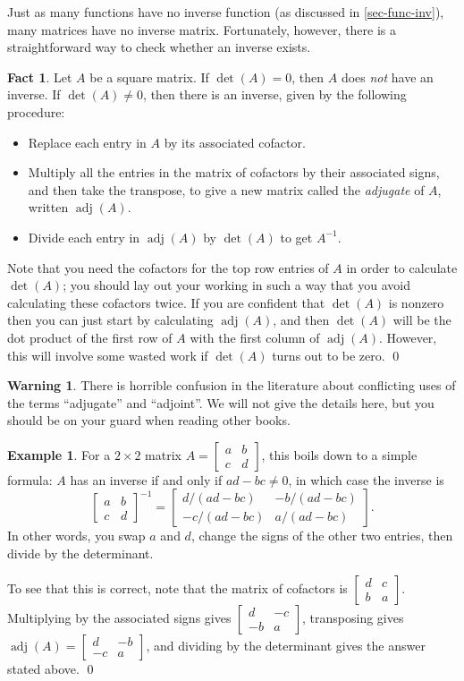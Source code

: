 \documentclass[a4paper]{book}
\newcommand{\RED}[1]{{\color{red}#1}}
\newcommand{\PURPLE}[1]{{\color{purple}#1}}
\newcommand{\bbm}       {\begin{bmatrix}}
\newcommand{\ebm}       {\end{bmatrix}}
\newcommand{\tm}        {\times}
\newcommand{\adj}       {\operatorname{adj}}
\renewcommand{\:}{\colon}
\newcommand{\EMPH}[1]{\RED{\emph{#1}}}
\newcommand{\DEFN}[1]{\PURPLE{\emph{#1}}}
\theoremstyle{definition}
\newtheorem{fact}[theorem]{Fact}
\newtheorem{warning}[theorem]{Warning}
\newtheorem{example}[theorem]{Example}
\begin{document}
Just as many functions have no inverse function (as discussed in
\autoref{sec-func-inv}), many matrices have no inverse matrix.
Fortunately, however, there is a straightforward way to check whether
an inverse exists.
\begin{fact}
 Let $A$ be a square matrix.  If $\det(A)=0$, then $A$ does \EMPH{not}
 have an inverse.  If $\det(A)\neq 0$, then there is an inverse, given
 by the following procedure:
 \begin{itemize}
  \item Replace each entry in $A$ by its associated cofactor.
  \item Multiply all the entries in the matrix of cofactors by their
   associated signs, and then take the transpose, to give a new matrix
   called the \DEFN{adjugate} of $A$, written $\adj(A)$.
  \item Divide each entry in $\adj(A)$ by $\det(A)$ to get $A^{-1}$.
 \end{itemize}
 Note that you need the cofactors for the top row entries of $A$ in
 order to calculate $\det(A)$; you should lay out your working in such
 a way that you avoid calculating these cofactors twice.  If you are
 confident that $\det(A)$ is nonzero then you can just start by
 calculating $\adj(A)$, and then $\det(A)$ will be the dot product of
 the first row of $A$ with the first column of $\adj(A)$.  However,
 this will involve some wasted work if $\det(A)$ turns out to be
 zero. \qed
\end{fact}
\begin{warning}
 There is horrible confusion in the literature about conflicting uses
 of the terms ``adjugate'' and ``adjoint''.  We will not give the
 details here, but you should be on your guard when reading other
 books.
\end{warning}
\begin{example}
 For a $2\tm 2$ matrix $A=\bbm a&b\\ c&d\ebm$, this boils down to a
 simple formula: $A$ has an inverse if and only if $ad-bc\neq 0$, in
 which case the inverse is
 \[ \bbm a&b\\ c&d\ebm^{-1} =
     \bbm  d/(ad-bc) & -b/(ad-bc) \\
          -c/(ad-bc) & a/(ad-bc) \ebm.
 \]
 In other words, you swap $a$ and $d$, change the signs of the other
 two entries, then divide by the determinant.

 To see that this is correct, note that the matrix of
 cofactors is $\bbm d&c\\b&a\ebm$.  Multiplying by the associated signs
 gives $\bbm d&-c\\-b&a\ebm$, transposing gives
 $\adj(A)=\bbm d&-b\\-c&a\ebm$, and dividing by the determinant gives
 the answer stated above.
 \qed
\end{example}
\end{document}
